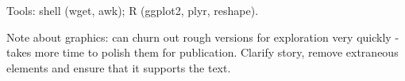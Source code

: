 \documentclass[oneside]{article}
\begin{document}
Tools: shell (wget, awk); R (ggplot2, plyr, reshape).

Note about graphics: can churn out rough versions for exploration very quickly - takes more time to polish them for publication.  Clarify story, remove extraneous elements and ensure that it supports the text.



\end{document}
